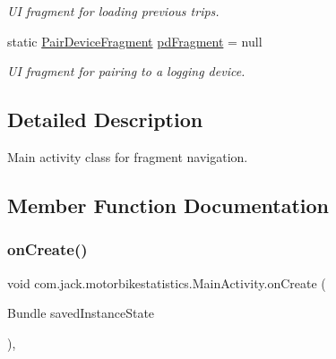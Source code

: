 \begin{DoxyCompactItemize}
\begin{DoxyCompactList}\small\item\em UI fragment for loading previous trips. \end{DoxyCompactList}\item 
\mbox{\label{classcom_1_1jack_1_1motorbikestatistics_1_1_main_activity_a2802ad16b5fdba42834d1b31e255dd96}} 
static \hyperlink{classcom_1_1jack_1_1motorbikestatistics_1_1_pair_device_fragment}{Pair\+Device\+Fragment} \hyperlink{classcom_1_1jack_1_1motorbikestatistics_1_1_main_activity_a2802ad16b5fdba42834d1b31e255dd96}{pd\+Fragment} = null
\begin{DoxyCompactList}\small\item\em UI fragment for pairing to a logging device. \end{DoxyCompactList}\end{DoxyCompactItemize}


\subsection{Detailed Description}
Main activity class for fragment navigation. 

\subsection{Member Function Documentation}
\mbox{\label{classcom_1_1jack_1_1motorbikestatistics_1_1_main_activity_a69fd97053d686c295dc2c58d5c4ffb79}} 
\subsubsection{\texorpdfstring{on\+Create()}{onCreate()}}
{\footnotesize\ttfamily void com.\+jack.\+motorbikestatistics.\+Main\+Activity.\+on\+Create (\begin{DoxyParamCaption}\item[{Bundle}]{saved\+Instance\+State }\end{DoxyParamCaption})\hspace{0.3cm}{\ttfamily [inline]}, {\ttfamily [protected]}}



